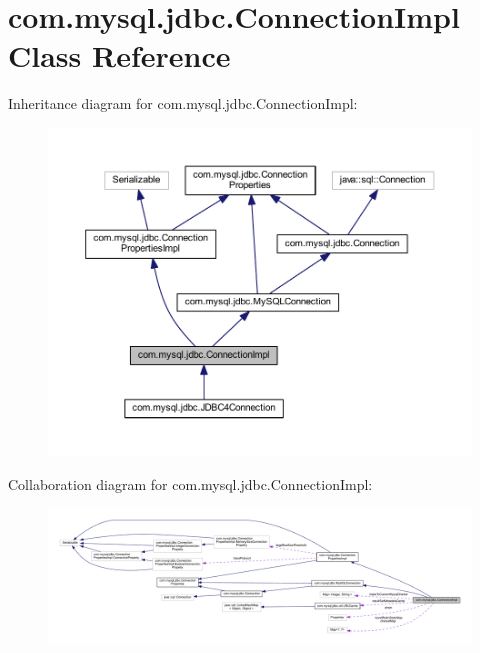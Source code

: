 \hypertarget{classcom_1_1mysql_1_1jdbc_1_1_connection_impl}{}\section{com.\+mysql.\+jdbc.\+Connection\+Impl Class Reference}
\label{classcom_1_1mysql_1_1jdbc_1_1_connection_impl}


Inheritance diagram for com.\+mysql.\+jdbc.\+Connection\+Impl\+:\nopagebreak
\begin{figure}[H]
\begin{center}
\leavevmode
\includegraphics[width=350pt]{classcom_1_1mysql_1_1jdbc_1_1_connection_impl__inherit__graph}
\end{center}
\end{figure}


Collaboration diagram for com.\+mysql.\+jdbc.\+Connection\+Impl\+:\nopagebreak
\begin{figure}[H]
\begin{center}
\leavevmode
\includegraphics[width=350pt]{classcom_1_1mysql_1_1jdbc_1_1_connection_impl__coll__graph}
\end{center}
\end{figure}

